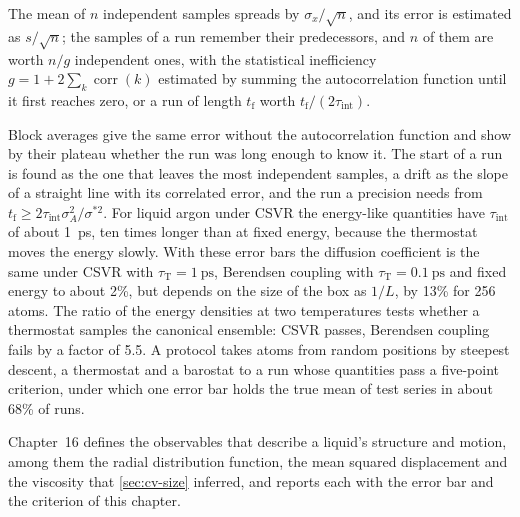 
The mean of $n$ independent samples spreads by $\sigma_x/\sqrt n$, and its
error is estimated as $s/\sqrt n$; the samples of a run remember their
predecessors, and $n$ of them are worth $n/g$ independent ones, with the
statistical inefficiency $g = 1 + 2\sum_k\operatorname{corr}(k)$ estimated
by summing the autocorrelation function until it first reaches zero, or a
run of length $t_{\mathrm f}$ worth $t_{\mathrm f}/(2\tau_{\mathrm{int}})$.

Block averages give the same error without the autocorrelation function
and show by their plateau
whether the run was long enough to know it. The start of a run is found as
the one that leaves the most independent samples, a drift as the slope of
a straight line with its correlated error, and the run a precision needs
from $t_{\mathrm f} \ge 2\tau_{\mathrm{int}}\sigma_A^2/\sigma^{\ast2}$.
For liquid argon
under CSVR the energy-like quantities have $\tau_{\mathrm{int}}$ of about
\SI{1}{\pico\second}, ten times longer than at fixed energy, because the
thermostat moves the energy slowly. With these error bars the diffusion
coefficient is the same under CSVR with $\tau_{\mathrm T} =
\SI{1}{\pico\second}$, Berendsen coupling with $\tau_{\mathrm T} =
\SI{0.1}{\pico\second}$ and fixed energy to about 2\%, but depends on the
size of the box as $1/L$, by 13\% for 256 atoms.
The ratio of the energy densities at two temperatures tests whether
a thermostat samples the canonical ensemble: CSVR passes, Berendsen
coupling fails by a factor of 5.5. A protocol takes atoms from random
positions by steepest descent, a thermostat and a barostat to a run whose
quantities pass a five-point criterion, under which one error bar holds
the true mean of test series in about 68\% of runs.

Chapter~16 defines the observables that describe a liquid's structure and
motion, among them the radial distribution function, the mean squared
displacement and the viscosity that \cref{sec:cv-size} inferred, and
reports each with the error bar and the criterion of this chapter.
